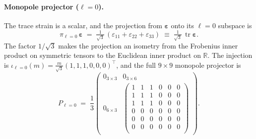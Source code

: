 \documentclass[11pt,a4paper]{article}
\newcommand{\eps}{\varepsilon}
\newcommand{\tr}{\operatorname{tr}}
\theoremstyle{plain}
\theoremstyle{definition}
\theoremstyle{remark}
\begin{document}
\paragraph{Monopole projector ($\ell=0$).}
The trace strain is a scalar, and the projection from
$\bm{\eps}$ onto its $\ell=0$ subspace is
\begin{equation}
  \pi_{\ell=0}\,\bm{\eps}
  \;=\;
  \tfrac{1}{\sqrt{3}}\,(\eps_{11}+\eps_{22}+\eps_{33})
  \;\equiv\; \tfrac{1}{\sqrt{3}}\,\tr\bm{\eps}.
\end{equation}
The factor $1/\sqrt{3}$ makes the projection an isometry from the
Frobenius inner product on symmetric tensors to the Euclidean inner
product on $\mathbb{R}$.  The injection is
$\iota_{\ell=0}(m)=\tfrac{m}{\sqrt{3}}(1,1,1,0,0,0)^\top$, and the
full $9\times 9$ monopole projector is
\begin{equation}
  P_{\ell=0}
  \;=\;
  \frac{1}{3}
  \begin{pmatrix}
    0_{3\times 3} & 0_{3\times 6}\\[2pt]
    0_{6\times 3} &
    \begin{pmatrix}
      1 & 1 & 1 & 0 & 0 & 0\\
      1 & 1 & 1 & 0 & 0 & 0\\
      1 & 1 & 1 & 0 & 0 & 0\\
      0 & 0 & 0 & 0 & 0 & 0\\
      0 & 0 & 0 & 0 & 0 & 0\\
      0 & 0 & 0 & 0 & 0 & 0\\
    \end{pmatrix}
  \end{pmatrix}.
  \label{eq:P0}
\end{equation}
\end{document}
